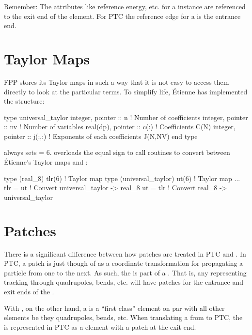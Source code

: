 {{{{{{Remember: The attributes like reference energy, etc. for a \bmad
{} instance are referenced to the exit end of the
element. For PTC the reference edge for a  is the entrance
end.

\section{Taylor Maps}
\label{s:ptc.taylor}

FPP stores its  Taylor maps in such a way that it is not
easy to access them directly to look at the particular terms. To
simplify life, \'Etienne has implemented the
structure:
\begin{example}
  type universal_taylor
    integer, pointer  :: n       ! Number of coefficients
    integer, pointer  :: nv      ! Number of variables
    real(dp), pointer :: c(:)    ! Coefficients C(N)
    integer, pointer  :: j(:,:)  ! Exponents of each coefficients J(N,NV)
  end type
\end{example}
\bmad always sets  = 6. \bmad overloads the equal sign to call 
routines to convert between \'Etienne's
 Taylor maps and :
\begin{example}
  type (real_8) tlr(6)           ! Taylor map
  type (universal_taylor) ut(6)  ! Taylor map
  ...
  tlr = ut                       ! Convert universal_taylor -> real_8
  ut = tlr                       ! Convert real_8 -> universal_taylor
\end{example}

\section{Patches}
\label{s:ptc.patch}

There is a significant difference between how patches are treated in
PTC and \bmad.  In PTC, a patch is just though of as a coordinate
transformation for propagating a particle from one  to the
next. As such, the  is part of a . That is, any
 representing tracking through quadrupoles, bends, etc. will
have patches for the entrance and exit ends of the .

With \bmad, on the other hand, a  is a ``first class''
element on par with all other elements be they quadrupoles, bends,
etc. When translating a  from \bmad to PTC, the 
is represented in PTC as a  element with a patch at the
exit end.

}}}}}}
